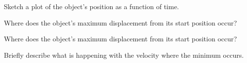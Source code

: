 \begin{problem}
  \begin{subproblem}
  \item Sketch a plot of the object's position as a function of time.
  \item Where does the object's maximum displacement from its start
    position occur?
    \vspace{3em}
  \item Where does the object's maximum displacement from its start
    position occur?
    \vspace{3em}
  \item Briefly describe what is happening with the velocity where the
    minimum occurs.
    \vfill
  \end{subproblem}

\end{problem}

